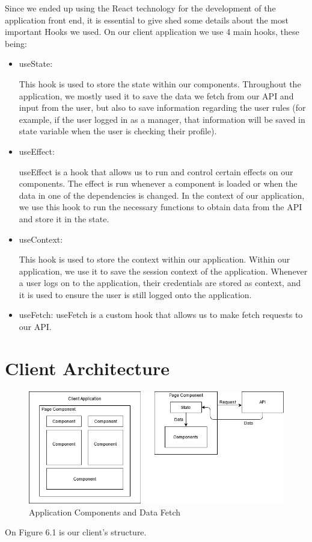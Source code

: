 \documentclass[a4paper,twoside,10pt]{report}
\begin{document}
Since we ended up using the React technology for the development of the application front end, it is essential to give shed some details about the most important Hooks we used.
\newline
On our client application we use 4 main hooks, these being:
\newpage
 \begin{itemize}
	\item useState\cite{USESTATE}:

This hook is used to store the state within our components. Throughout the application, we mostly used it to save the data we fetch from our API and input from the user, but also to save information regarding the user rules (for example, if the user logged in as a manager, that information will be saved in state variable when the user is checking their profile).
	\item useEffect\cite{USEEFFECT}:

useEffect is a hook that allows us to run and control certain effects on our components. The effect is run whenever a component is loaded or when the data in one of the dependencies is changed. In the context of our application, we use this hook to run the necessary functions to obtain data from the API and store it in the state.
	\item useContext\cite{USECONTEXT}:

This hook is used to store the context within our application. Within our application, we use it to save the session context of the application. Whenever a user logs on to the application, their credentials are stored as context, and it is used to ensure the user is still logged onto the application.
	\item useFetch\cite{USEFETCH}: useFetch is a custom hook that allows us to make fetch requests to our API.
\end{itemize}

\section{Client Architecture}
\begin{figure}[h!]
\center
  \includegraphics[width=\textwidth]{client app architecture.png}
\caption{Application Components and Data Fetch}
\end{figure}
On Figure 6.1 is our client's structure. 
\end{document}
